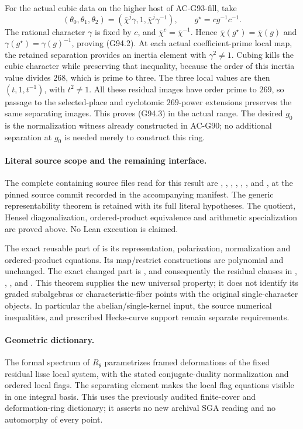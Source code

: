 For the actual cubic data on the higher host of AC-G93-fill,
take
\[
 (\theta_0,\theta_1,\theta_2)
       =(\bar\chi^j\gamma,1,\bar\chi^j\gamma^{-1}),
 \qquad g^\star=cg^{-1}c^{-1}.
 \tag{G94.15}
\]
The rational character \(\gamma\) is fixed by \(c\), and
\(\bar\chi^c=\bar\chi^{-1}\).  Hence
\(\bar\chi(g^\star)=\bar\chi(g)\) and
\(\gamma(g^\star)=\gamma(g)^{-1}\), proving (G94.2).
At each actual coefficient-prime local map, the retained
separation provides an inertia element with
\(\gamma^2\ne1\).  Cubing kills the cubic character while
preserving that inequality, because the order of this
inertia value divides \(268\), which is prime to three.
The three local values are then \((t,1,t^{-1})\), with
\(t^2\ne1\).  All these residual images have order prime
to \(269\), so passage to the selected-place and cyclotomic
\(269\)-power extensions preserves the same separating
images.  This proves (G94.3) in the actual range.
The desired \(g_0\) is the normalization witness already
constructed in AC-G90; no additional separation at
\(g_0\) is needed merely to construct this ring.

\paragraph{Literal source scope and the remaining interface.}
The complete containing source files read for this result are
,
, ,
,
,
, and
,
at the pinned source commit recorded in the accompanying manifest.
The generic representability theorem is retained with its full
literal hypotheses.  The quotient, Hensel diagonalization,
ordered-product equivalence and arithmetic specialization are
proved above.  No Lean execution is claimed.

The exact reusable part of  is its representation,
polarization, normalization and ordered-product equations.
Its map/restrict constructions are polynomial and unchanged.
The exact changed part is , and consequently
the residual clauses in , ,
, and .  This theorem supplies the
new  universal property; it does not identify
its graded subalgebras or characteristic-fiber points with
the original single-character objects.  In particular the
 abelian/single-kernel input, the source
numerical inequalities, and prescribed Hecke-curve support
remain separate requirements.

\paragraph{Geometric dictionary.}
The formal spectrum of \(R_{\theta}\) parametrizes framed
deformations of the fixed residual lisse local system, with
the stated conjugate-duality normalization and ordered local
flags.  The separating element makes the local flag equations
visible in one integral basis.  This uses the previously audited
finite-cover and deformation-ring dictionary; it asserts no
new archival SGA reading and no automorphy of every point.
